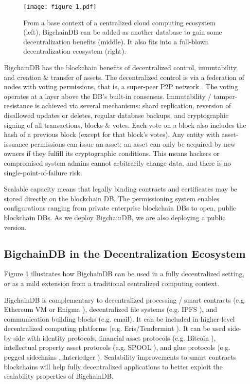 \begin{figure}[!ht]
  \centering
  \texttt{[image: figure\_1.pdf]}
  \caption{From a base context of a centralized cloud computing ecosystem (left), BigchainDB can be added as another database to gain some decentralization benefits (middle).
  It also fits into a full-blown decentralization ecosystem (right).}
  \label{fig:bigchain_ecosystem}
\end{figure}

BigchainDB has the blockchain benefits of decentralized control, immutability, and creation \& transfer of assets.
The decentralized control is via a federation of nodes with voting permissions, that is, a super-peer P2P network \cite{ozsu2011principles}.
The voting operates at a layer above the DB’s built-in consensus.
Immutability / tamper-resistance is achieved via several mechanisms: shard replication, reversion of disallowed updates or deletes, regular database backups, and cryptographic signing of all transactions, blocks \& votes. Each vote on a block also includes the hash of a previous block (except for that block's votes).
Any entity with asset-issuance permissions can issue an asset; an asset can only be acquired by new owners if they fulfill its cryptographic conditions.
This means hackers or compromised system admins cannot arbitrarily change data, and there is no single-point-of-failure risk.

Scalable capacity means that legally binding contracts and certificates may be stored directly on the blockchain DB.
The permissioning system enables configurations ranging from private enterprise blockchain DBs to open, public blockchain DBs.
As we deploy BigchainDB, we are also deploying a public version.

\subsection{BigchainDB in the Decentralization Ecosystem}
Figure \ref{fig:bigchain_ecosystem} illustrates how BigchainDB can be used in a fully decentralized setting, or as a mild extension from a traditional centralized computing context.

BigchainDB is complementary to decentralized processing / smart contracts (e.g. Ethereum VM \cite{ethereum}\cite{buterin-ethereum} or Enigma \cite{enigma}\cite{zyskind2015enigma}), decentralized file systems (e.g. IPFS \cite{ipfs}), and communication building blocks (e.g. email).
It can be included in higher-level decentralized computing platforms (e.g. Eris/Tendermint \cite{eris}\cite{tendermint}).
It can be used side-by-side with identity protocols, financial asset protocols (e.g. Bitcoin \cite{nakamoto2009bitcoin}), intellectual property asset protocols (e.g. SPOOL \cite{dejonghe_spool}), and glue protocols (e.g. pegged sidechains \cite{back2010sidechains}, Interledger \cite{thomas2015interledger}).
Scalability improvements to smart contracts blockchains will help fully decentralized applications to better exploit the scalability properties of BigchainDB.

